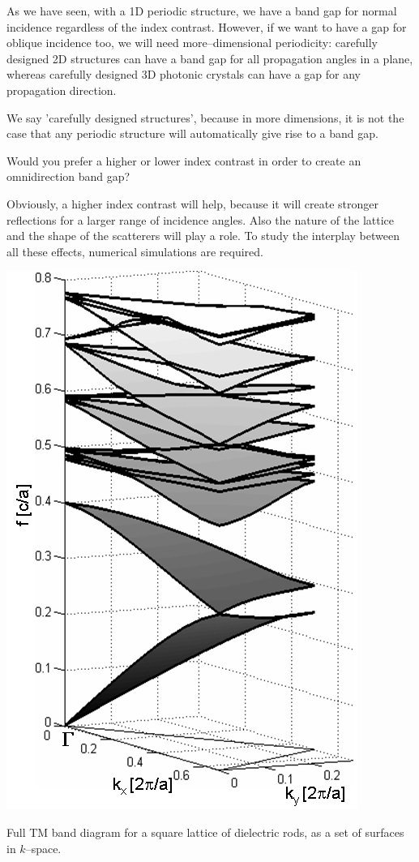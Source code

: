 \pagebreak


As we have seen, with a 1D periodic structure, we have a band gap for normal incidence regardless of the index contrast. However, if we want to have a gap for oblique incidence too, we will need more--dimensional periodicity: carefully designed 2D structures can have a band gap for all propagation angles in a plane, whereas carefully designed 3D photonic crystals can have a gap for any propagation direction.

We say 'carefully designed structures', because in more dimensions, it is not the case that any periodic structure will automatically give rise to a band gap.

\begin{cue}
Would you prefer a higher or lower index contrast in order to create an omnidirection band gap?
\end{cue}

Obviously, a higher index contrast will help, because it will create stronger reflections for a larger range of incidence angles. Also the nature of the lattice and the shape of the scatterers will play a role. To study the interplay between all these effects, numerical simulations are required.

\begin{marginfigure}[-1.5cm]
\centering
\includegraphics{symmetry/figures/3d_bands}
\caption{Full TM band diagram for a square lattice of dielectric rods, as a set of surfaces in $k$--space.}
\label{fig-bands-rods-3D}
\end{marginfigure}


